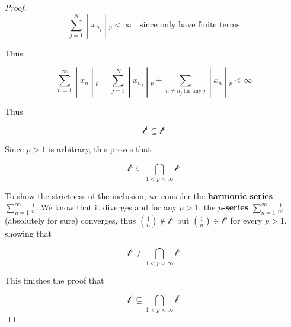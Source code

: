 \begin{proof}
\[\left. \sum\limits_{j = 1}^{N} \middle| x_{n_{j}} \middle| {}_{p} < \infty\quad\text{since only have finite terms} \right.\]

Thus

\[\left. \sum\limits_{n = 1}^{\infty} \middle| x_{n} \middle| {}_{p} = \sum\limits_{j = 1}^{N} \middle| x_{n_{j}} \middle| {}_{p} + \sum\limits_{n \neq n_{j}\ \text{for any}\ j} \middle| x_{n} \middle| {}_{p} < \infty \right.\]

Thus

\[\mathcal{l}^{1} \subseteq \mathcal{l}^{p}\]

Since \(p > 1\) is arbitrary, this proves that

\[\mathcal{l}^{1} \subseteq \bigcap\limits_{1 < p < \infty}\mathcal{l}^{p}\]

To show the strictness of the inclusion, we consider the \textbf{harmonic series} \(\sum_{n = 1}^{\infty}\frac{1}{n}\). We know that it diverges and for any \(p > 1\), the \textbf{\(p\)-series} \(\sum_{n = 1}^{\infty}\frac{1}{n^{p}}\) (absolutely for sure) converges, thus \((\frac{1}{n}) \notin \mathcal{l}^{1}\) but \((\frac{1}{n}) \in \mathcal{l}^{p}\) for every \(p > 1\), showing that

\[\mathcal{l}^{1} \neq \bigcap\limits_{1 < p < \infty}\mathcal{l}^{p}\]

This finishes the proof that

\[\mathcal{l}^{1} \subsetneq \bigcap\limits_{1 < p < \infty}\mathcal{l}^{p}\]

\end{proof}

